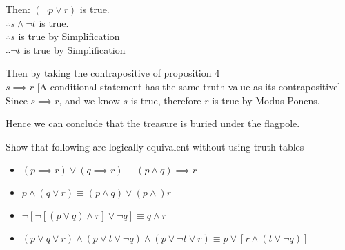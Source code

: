 \documentclass[addpoints]{exam}
\newenvironment{problem}[2][Problem]{\begin{trivlist}
    \item[\hskip \labelsep {\bfseries #1}\hskip \labelsep {\bfseries #2.}]}{\end{trivlist}}
\begin{document}
\begin{sloppypar}
\begin{questions}
\begin{solution}
        Then: $ (\neg p \lor r) $ is true. \\ 
        $ \therefore s \land \neg t $ is true. \\ 
        $ \therefore s $ is true by Simplification \\ 
        $ \therefore \neg t $ is true by Simplification 

        Then by taking the contrapositive of proposition 4 \\ 
        $ s \implies r $ [A conditional statement has the same truth value as its contrapositive] \\ 
        Since $s \implies r$, and we know $s$ is true, therefore $r$ is true by Modus Ponens. 

        Hence we can conclude that the treasure is buried under the flagpole.
    \end{solution}
\end{questions}

\begin{problem}{7}
Show that following are logically equivalent without using truth tables
\begin{itemize}
    \item[(a)] $ (p \implies r) \lor (q \implies r)  \equiv  (p \land q) \implies r $
    \item[(b)] $ p \land (q \lor r) \equiv (p \land q) \lor (p \land) r $
    \item[(c)] $ \neg [\neg[(p \lor q) \land r] \lor \neg q] \equiv q \land r $
        \item[(d)]$ (p \lor q \lor r) \land (p \lor t \lor \neg q) \land (p \lor \neg t \lor r) \equiv p \lor [r \land (t \lor \neg q)] $
\end{itemize}

\end{problem}

\begin{questions}
    \question
    \begin{solution}
        

\end{solution}
\end{questions}
\end{sloppypar}
\end{document}
